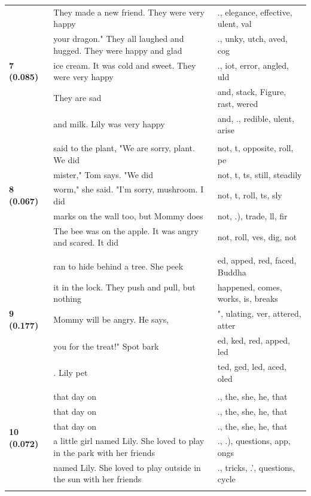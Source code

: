 \documentclass{article}
\theoremstyle{plain}
\theoremstyle{definition}
\theoremstyle{remark}
\begin{document}
\begin{longtable}{|p{}|p{}|p{}|}
\multirow{5}{*}{\textbf{7 (0.085)}} & They made a new friend. They were very happy & .,  elegance, effective, ulent, val \\
& your dragon."  They all laughed and hugged. They were happy and glad & ., unky, utch, aved,  cog \\
& ice cream. It was cold and sweet. They were very happy & ., iot,  error, angled, uld \\
& They are sad & and, stack, Figure, rast, wered \\
& and milk. Lily was very happy & and, ., redible, ulent,  arise \\
& & \\
\multirow{5}{*}{\textbf{8 (0.067)}} & said to the plant, "We are sorry, plant. We did & not, t,  opposite,  roll, pe \\
& mister," Tom says. "We did & not, t, ts,  still,  steadily \\
& worm," she said. "I'm sorry, mushroom. I did & not, t,  roll, ts,  sly \\
& marks on the wall too, but Mommy does & not, .),  trade,  ll,  fir \\
& The bee was on the apple. It was angry and scared. It did & not,  roll, ves, dig, not \\
& & \\
\multirow{5}{*}{\textbf{9 (0.177)}} & ran to hide behind a tree. She peek & ed, apped, red, faced,  Buddha \\
& it in the lock. They push and pull, but nothing & happened,  comes,  works,  is,  breaks \\
& Mommy will be angry. He says, & ", ulating, ver, attered, atter \\
& you for the treat!" Spot bark & ed, ked, red, apped, led \\
& . Lily pet & ted, ged, led, aced, oled \\
& & \\
\multirow{5}{*}{\textbf{10 (0.072)}} & that day on & .,  the,  she,  he,  that \\
& that day on & .,  the,  she,  he,  that \\
& that day on & .,  the,  she,  he,  that \\
& a little girl named Lily. She loved to play in the park with her friends & ., .),  questions,  app, ongs \\
& named Lily. She loved to play outside in the sun with her friends & .,  tricks, .',  questions,  cycle \\
& & \\

\end{longtable}
\end{document}
